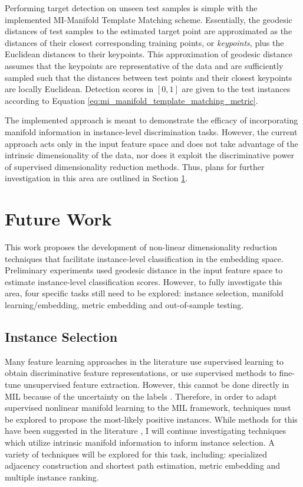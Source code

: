 Performing target detection on unseen test samples is simple with the implemented MI-Manifold Template Matching scheme.  Essentially, the geodesic distances of test samples to the estimated target point are approximated as the distances of their closest corresponding training points, or \textit{keypoints}, plus the Euclidean distances to their keypoints.  This approximation of geodesic distance assumes that the keypoints are representative of the data and are sufficiently sampled such that the distances between test points and their closest keypoints are locally Euclidean.  Detection scores in $[0,1]$ are given to the test instances according to Equation \ref{eq:mi_manifold_template_matching_metric}.

The implemented approach is meant to demonstrate the efficacy of incorporating manifold information in instance-level discrimination tasks.  However, the current approach acts only in the input feature space and does not take advantage of the intrinsic dimensionality of the data, nor does it exploit the discriminative power of supervised dimensionality reduction methods.  Thus, plans for further investigation in this area are outlined in Section \ref{sec:tech_approach_future_work}.

\section{Future Work} \label{sec:tech_approach_future_work}
This work proposes the development of non-linear dimensionality reduction techniques that facilitate instance-level classification in the embedding space.  Preliminary experiments used geodesic distance in the input feature space to estimate instance-level classification scores.  However, to fully investigate this area, four specific tasks still need to be explored: instance selection, manifold learning/embedding, metric embedding and out-of-sample testing.

\subsection{Instance Selection}
Many feature learning approaches in the literature use supervised learning to obtain discriminative feature representations, or use supervised methods to fine-tune unsupervised  feature extraction.  However, this cannot be done directly in MIL because of the uncertainty on the labels \citep{Carbonneau2016MILSurvey}.  Therefore, in order to adapt supervised nonlinear manifold learning to the MIL framework, techniques must be explored to propose the most-likely positive instances.  While methods for this have been suggested in the literature \citep{Kim2010LocalDRMIL, Maron1998DiverseDensity, Bocinsky2019SPIEMIACEInitialization}, I will continue investigating techniques which utilize intrinsic manifold information to inform instance selection.  A variety of techniques will be explored for this task, including: specialized adjacency construction and shortest path estimation, metric embedding and multiple instance ranking.

